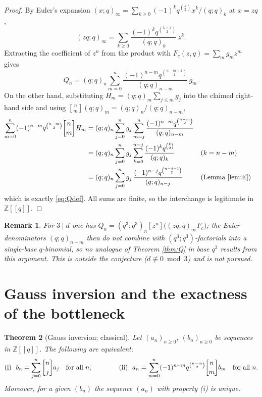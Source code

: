 \documentclass[11pt]{article}
\newtheorem{theorem}{Theorem}
\newtheorem{remark}[theorem]{Remark}
\newcommand{\qbin}[2]{\genfrac{[}{]}{0pt}{}{#1}{#2}}
\newcommand{\ZZ}{\mathbb{Z}}
\begin{document}
\begin{proof}
By Euler's expansion $(x;q)_\infty=\sum_{k\ge0}(-1)^kq^{\binom{k}{2}}x^k/(q;q)_k$ at
$x=zq$,
\[
(zq;q)_\infty=\sum_{k\ge 0}\frac{(-1)^k q^{\binom{k+1}{2}}}{(q;q)_k}\,z^k .
\]
Extracting the coefficient of $z^n$ from the product with $F_c(z,q)=\sum_m g_mz^m$ gives
\begin{equation}\label{eq:Qdef}
Q_n=(q;q)_n\sum_{m=0}^{n}\frac{(-1)^{n-m}q^{\binom{n-m+1}{2}}}{(q;q)_{n-m}}\,g_m .
\end{equation}
On the other hand, substituting $H_m=(q;q)_m\sum_{j\le m}g_j$ into the claimed right-hand
side and using $\qbin{n}{m}(q;q)_m=(q;q)_n/(q;q)_{n-m}$,
\begin{align*}
\sum_{m=0}^{n}(-1)^{n-m}q^{\binom{n-m}{2}}\qbin{n}{m}H_m
&=(q;q)_n\sum_{j=0}^{n}g_j\sum_{m=j}^{n}\frac{(-1)^{n-m}q^{\binom{n-m}{2}}}{(q;q)_{n-m}}
\\
&=(q;q)_n\sum_{j=0}^{n}g_j\sum_{k=0}^{n-j}\frac{(-1)^{k}q^{\binom{k}{2}}}{(q;q)_{k}}
&&(k=n-m)
\\
&=(q;q)_n\sum_{j=0}^{n}g_j\,
\frac{(-1)^{n-j}q^{\binom{n-j+1}{2}}}{(q;q)_{n-j}}
&&\text{(Lemma \ref{lem:E})}
\end{align*}
which is exactly \eqref{eq:Qdef}. All sums are finite, so the interchange is legitimate
in $\ZZ[[q]]$.
\end{proof}

\begin{remark}
For $3\mid d$ one has $Q_n=(q^3;q^3)_n[z^n]\bigl((zq;q)_\infty F_c\bigr)$; the Euler
denominators $(q;q)_{n-m}$ then do not combine with $(q^3;q^3)$-factorials into a
single-base $q$-binomial, so no analogue of Theorem \ref{thm:Q} in base $q^3$ results from
this argument. This is outside the conjecture ($d\not\equiv0\bmod 3$) and is not pursued.
\end{remark}

\section{Gauss inversion and the exactness of the bottleneck}

\begin{theorem}[Gauss inversion; classical]\label{thm:G}
Let $(a_n)_{n\ge0}$, $(b_n)_{n\ge0}$ be sequences in $\ZZ[[q]]$. The following are
equivalent:
\[
\textup{(i)}\ \ b_n=\sum_{j=0}^{n}\qbin{n}{j}a_j\quad\text{for all }n;
\qquad\qquad
\textup{(ii)}\ \ a_n=\sum_{m=0}^{n}(-1)^{n-m}q^{\binom{n-m}{2}}\qbin{n}{m}b_m
\quad\text{for all }n.
\]
Moreover, for a given $(b_n)$ the sequence $(a_n)$ with property \textup{(i)} is unique.
\end{theorem}
\end{document}
